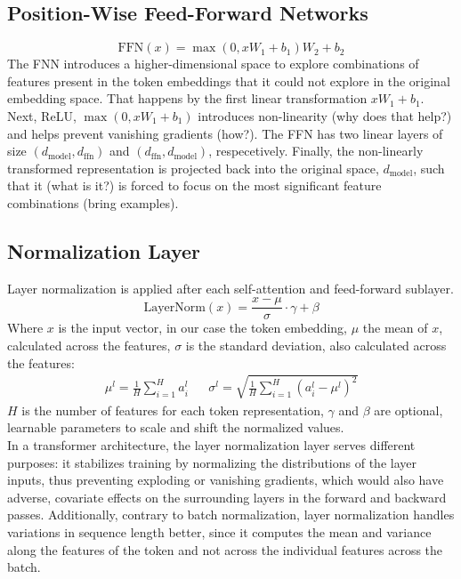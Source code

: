 \subsection{Position-Wise Feed-Forward Networks} \label{sec:ffn}
\begin{equation}
	\text{FFN}(x) = \max(0, xW_1 + b_1)W_2 + b_2
\end{equation}
The FNN introduces a higher-dimensional space to explore combinations of features present in the token embeddings that it could not explore in the original embedding space.
That happens by the first linear transformation \(xW_1 + b_1\).
Next, ReLU, \(\max(0, xW_1 + b_1)\) introduces non-linearity (why does that help?) and helps prevent vanishing gradients (how?). 
The FFN has two linear layers of size \(\left(d_{\text{model}}, d_{\text{ffn}}\right)\) and \(\left(d_{\text{ffn}}, d_{\text{model}}\right)\), respecetively.
Finally, the non-linearly transformed representation is projected back into the original space, \(d_{\text{model}}\), such that it (what is it?) is forced to focus on the most significant feature combinations (bring examples).

\subsection{Normalization Layer} \label{sec:normalization}
Layer normalization is applied after each self-attention and feed-forward sublayer.
\begin{equation}
	\text{LayerNorm}(x) = \frac{x - \mu}{\sigma} \cdot \gamma + \beta
\end{equation}
Where \(x\) is the input vector, in our case the token embedding, \(\mu\) the mean of \(x\), calculated across the features, \(\sigma\) is the standard deviation, also calculated across the features:
\begin{align}
	\mu^l = \frac{1}{H} \sum_{i=1}^H a_i^l &   & \sigma^l = \sqrt{\frac{1}{H}\sum_{i=1}^H (a_i^l - \mu^l)^2} 
\end{align}
\(H\) is the number of features for each token representation, \(\gamma\) and \(\beta\) are optional, learnable parameters to scale and shift the normalized values. \\
In a transformer architecture, the layer normalization layer serves different purposes: it stabilizes training by normalizing the distributions of the layer inputs, thus preventing exploding or vanishing gradients, which would also have adverse, covariate effects on the surrounding layers in the forward and backward passes.
Additionally, contrary to batch normalization, layer normalization handles variations in sequence length better, since it computes the mean and variance along the features of the token and not across the individual features across the batch.

